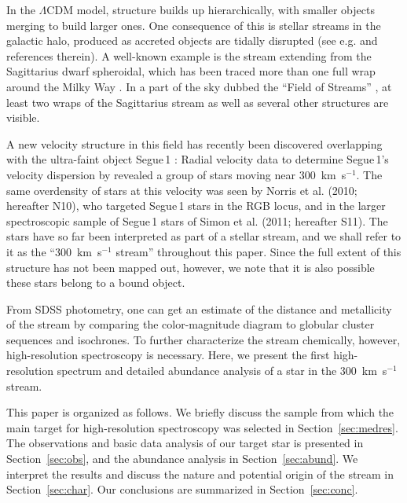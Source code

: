 \documentclass{emulateapj}
\begin{document}
In the $\Lambda$CDM model, structure builds up hierarchically, with smaller objects merging to build larger ones. One consequence of this is stellar streams in the galactic halo, produced as accreted objects are tidally disrupted (see e.g. \citealt{Lynden-Bell1995} and references therein). A well-known example is the stream extending from the Sagittarius dwarf spheroidal, which has been traced more than one full wrap around the Milky Way \citep[e.g.][]{Ibata1994, Majewski2003}. In a part of the sky dubbed the ``Field of Streams'' \citep{Belokurov2006b}, at least two wraps of the Sagittarius stream as well as several other structures are visible.

A new velocity structure in this field has recently been discovered overlapping with the ultra-faint object Segue\,1 \citep{Belokurov2007}: Radial velocity data to determine Segue\,1's velocity dispersion by \citet{Geha2009} revealed a group of stars moving near 300~km~s$^{-1}$. The same overdensity of stars at this velocity was seen by Norris et al. (2010; hereafter N10)\nocite{Norris2010a}, who targeted Segue\,1 stars in the RGB locus, and in the larger spectroscopic sample of Segue\,1 stars of Simon et al. (2011; hereafter S11)\nocite{Simon2011}. The stars have so far been interpreted as part of a stellar stream, and we shall refer to it as the ``300~km~s$^{-1}$ stream'' throughout this paper. Since the full extent of this structure has not been mapped out, however, we note that it is also possible these stars belong to a bound object.

From SDSS photometry, one can get an estimate of the distance and metallicity of the stream by comparing the color-magnitude diagram to globular cluster sequences and isochrones. To further characterize the stream chemically, however, high-resolution spectroscopy is necessary. Here, we present the first high-resolution spectrum and detailed abundance analysis of a star in the 300~km~s$^{-1}$ stream.

This paper is organized as follows. We briefly discuss the sample from which the main target for high-resolution spectroscopy was selected in Section~\ref{sec:medres}. The observations and basic data analysis of our target star is presented in Section~\ref{sec:obs}, and the abundance analysis in Section~\ref{sec:abund}. We interpret the results and discuss the nature and potential origin of the stream in Section~\ref{sec:char}. Our conclusions are summarized in Section~\ref{sec:conc}.
\end{document}

